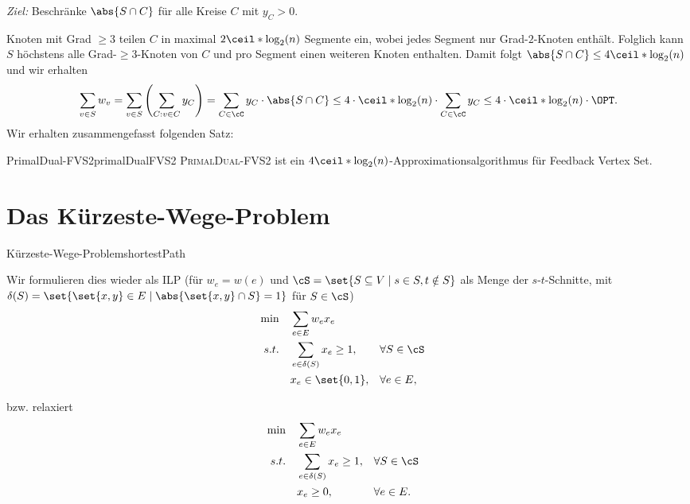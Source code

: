 \documentclass[language=ngerman,algolist]{TemplateLecture}
\begin{document}
\emph{Ziel:} Beschränke $\abs{S \cap C}$ für alle Kreise $C$ mit $y_C > 0$.

Knoten mit Grad $\geq 3$ teilen $C$ in maximal $2\ceil*{\log_2(n)}$ Segmente ein, wobei jedes Segment nur Grad-$2$-Knoten enthält. Folglich kann $S$ höchstens alle Grad-$\geq 3$-Knoten von $C$ und pro Segment einen weiteren Knoten enthalten. Damit folgt $\abs{S \cap C} \leq 4\ceil*{\log_2(n)}$ und wir erhalten
\begin{equation*}
    \sum_{v \in S} w_v = \sum_{v \in S}\left( \sum_{C: v \in C} y_C \right) = \sum_{C \in \cC} y_C \cdot \abs{S \cap C} \leq 4 \cdot \ceil*{\log_2(n)} \cdot \sum_{C \in \cC} y_C \leq 4 \cdot \ceil*{\log_2(n)} \cdot \OPT.
\end{equation*}
Wir erhalten zusammengefasst folgenden Satz:
\begin{thm}{PrimalDual-FVS2}{primalDualFVS2}
    \textsc{PrimalDual-FVS2} ist ein $4\ceil*{\log_2(n)}$-Approximationsalgorithmus für Feedback Vertex Set.
\end{thm}

\section{Das Kürzeste-Wege-Problem}\label{sec:shortestPath}

\begin{prob}{Kürzeste-Wege-Problem}{shortestPath}
\end{prob}

Wir formulieren dies wieder als ILP (für $w_e = w(e)$ und $\cS = \set{S \subseteq V \mid s \in S, t \notin S}$ als Menge der $s$-$t$-Schnitte, mit $\delta(S) = \set{\set{x,y} \in E \mid \abs{\set{x,y} \cap S} = 1}$ für $S \in \cS$)
\begin{equation}
    \begin{aligned}
        \min \quad & \sum_{e \in E} w_e x_e \\
        s.t. \quad & \sum_{e \in \delta(S)} x_e \geq 1, && \forall S \in \cS \\
        & x_e \in \set{0,1}, && \forall e \in E,
    \end{aligned}\label{eq:shortestPathPrimalUnrelaxed}
\end{equation}

bzw. relaxiert 
\begin{equation}
    \begin{aligned}
        \min \quad & \sum_{e \in E} w_e x_e \\
        s.t. \quad & \sum_{e \in \delta(S)} x_e \geq 1, && \forall S \in \cS \\
        & x_e \geq 0, && \forall e \in E.
    \end{aligned}\label{eq:shortestPathPrimal}
\end{equation}
\end{document}
